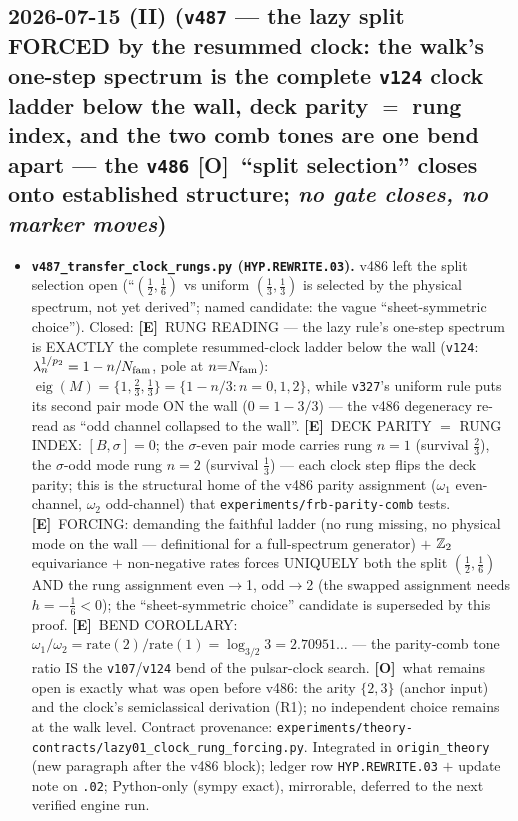 \documentclass[11pt]{article}
\providecommand{\mE}{\textbf{[E]}}\providecommand{\mC}{\textbf{[C]}}
\providecommand{\mO}{\textbf{[O]}}\providecommand{\mX}{\textbf{[X]}}
\begin{document}
\subsection*{2026-07-15 (II) (\texttt{v487} --- the lazy split FORCED by the resummed clock: the walk's one-step spectrum is the complete \texttt{v124} clock ladder below the wall, deck parity $=$ rung index, and the two comb tones are one bend apart --- the \texttt{v486} \mO\ ``split selection'' closes onto established structure; \emph{no gate closes, no marker moves})}
\begin{itemize}[leftmargin=1.5em]
\item \textbf{\texttt{v487\_transfer\_clock\_rungs.py} (\texttt{HYP.REWRITE.03}).} v486 left the split
selection open (``$(\tfrac12,\tfrac16)$ vs uniform $(\tfrac13,\tfrac13)$ is selected by the physical
spectrum, not yet derived''; named candidate: the vague ``sheet-symmetric choice''). Closed: \mE\ RUNG
READING --- the lazy rule's one-step spectrum is EXACTLY the complete resummed-clock ladder below the
wall (\texttt{v124}: $\lambda_n^{1/p_2}=1-n/N_{\mathrm{fam}}$, pole at $n{=}N_{\mathrm{fam}}$):
$\operatorname{eig}(M)=\{1,\tfrac23,\tfrac13\}=\{1-n/3:n=0,1,2\}$, while \texttt{v327}'s uniform rule
puts its second pair mode ON the wall ($0=1-3/3$) --- the v486 degeneracy re-read as ``odd channel
collapsed to the wall''. \mE\ DECK PARITY $=$ RUNG INDEX: $[B,\sigma]=0$; the $\sigma$-even pair mode
carries rung $n{=}1$ (survival $\tfrac23$), the $\sigma$-odd mode rung $n{=}2$ (survival $\tfrac13$) ---
each clock step flips the deck parity; this is the structural home of the v486 parity assignment
($\omega_1$ even-channel, $\omega_2$ odd-channel) that \texttt{experiments/frb-parity-comb} tests.
\mE\ FORCING: demanding the faithful ladder (no rung missing, no physical mode on the wall ---
definitional for a full-spectrum generator) $+$ $\mathbb{Z}_2$ equivariance $+$ non-negative rates forces
UNIQUELY both the split $(\tfrac12,\tfrac16)$ AND the rung assignment even$\to$1, odd$\to$2 (the swapped
assignment needs $h=-\tfrac16<0$); the ``sheet-symmetric choice'' candidate is superseded by this proof.
\mE\ BEND COROLLARY: $\omega_1/\omega_2=\mathrm{rate}(2)/\mathrm{rate}(1)=\log_{3/2}3=2.70951\ldots$ ---
the parity-comb tone ratio IS the \texttt{v107}/\texttt{v124} bend of the pulsar-clock search. \mO\ what
remains open is exactly what was open before v486: the arity $\{2,3\}$ (anchor input) and the clock's
semiclassical derivation (R1); no independent choice remains at the walk level. Contract provenance:
\texttt{experiments/theory-contracts/lazy01\_clock\_rung\_forcing.py}. Integrated in
\texttt{origin\_theory} (new paragraph after the v486 block); ledger row \texttt{HYP.REWRITE.03} $+$
update note on \texttt{.02}; Python-only (sympy exact), mirrorable, deferred to the next verified engine
run.
\end{itemize}
\end{document}
